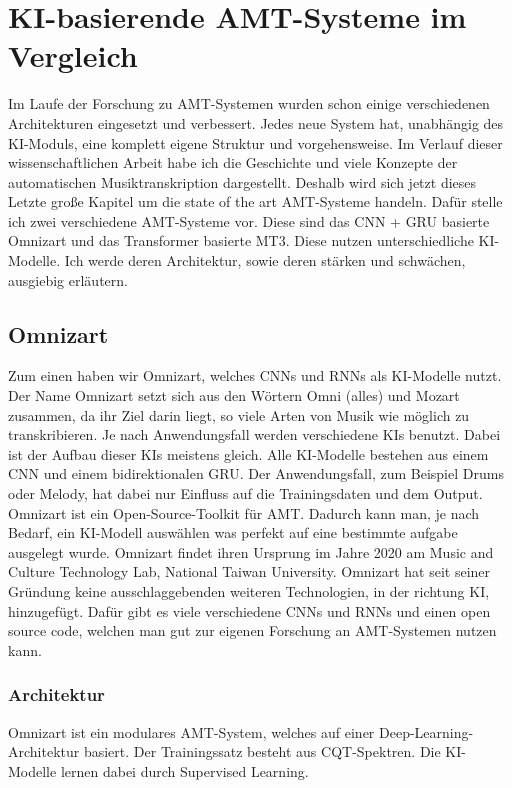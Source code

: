 \section{KI-basierende AMT-Systeme im Vergleich}
Im Laufe der Forschung zu AMT-Systemen wurden schon einige verschiedenen Architekturen eingesetzt und verbessert.
Jedes neue System hat, unabhängig des KI-Moduls, eine komplett eigene Struktur und vorgehensweise.
Im Verlauf dieser wissenschaftlichen Arbeit habe ich die Geschichte
und viele Konzepte der automatischen Musiktranskription dargestellt.
Deshalb wird sich jetzt dieses Letzte große Kapitel um die state of the art AMT-Systeme handeln.
Dafür stelle ich zwei verschiedene AMT-Systeme vor.
Diese sind das CNN + GRU basierte Omnizart und das Transformer basierte MT3.
Diese nutzen unterschiedliche KI-Modelle.
Ich werde deren Architektur, sowie deren stärken und schwächen, ausgiebig erläutern.

\subsection{Omnizart}
Zum einen haben wir Omnizart, welches CNNs und RNNs als KI-Modelle nutzt.
\cite{wu2021omnizart}
Der Name Omnizart setzt sich aus den Wörtern Omni (alles) und Mozart zusammen,
da ihr Ziel darin liegt, so viele Arten von Musik wie möglich zu transkribieren.
Je nach Anwendungsfall werden verschiedene KIs benutzt.
Dabei ist der Aufbau dieser KIs meistens gleich.
Alle KI-Modelle bestehen aus einem CNN und einem bidirektionalen GRU.
Der Anwendungsfall, zum Beispiel Drums oder Melody, hat dabei nur Einfluss auf die Trainingsdaten und dem Output.
Omnizart ist ein Open-Source-Toolkit für AMT.
Dadurch kann man, je nach Bedarf, ein KI-Modell auswählen was perfekt auf eine bestimmte aufgabe ausgelegt wurde.
Omnizart findet ihren Ursprung im Jahre 2020 am Music and Culture Technology Lab, National Taiwan University.
Omnizart hat seit seiner Gründung keine ausschlaggebenden weiteren Technologien, in der richtung KI, hinzugefügt.
Dafür gibt es viele verschiedene CNNs und RNNs und einen open source code,
welchen man gut zur eigenen Forschung an AMT-Systemen nutzen kann.

\subsubsection{Architektur}
Omnizart ist ein modulares AMT-System, welches auf einer Deep-Learning-Architektur basiert.
Der Trainingssatz besteht aus CQT-Spektren.
Die KI-Modelle lernen dabei durch Supervised Learning.

